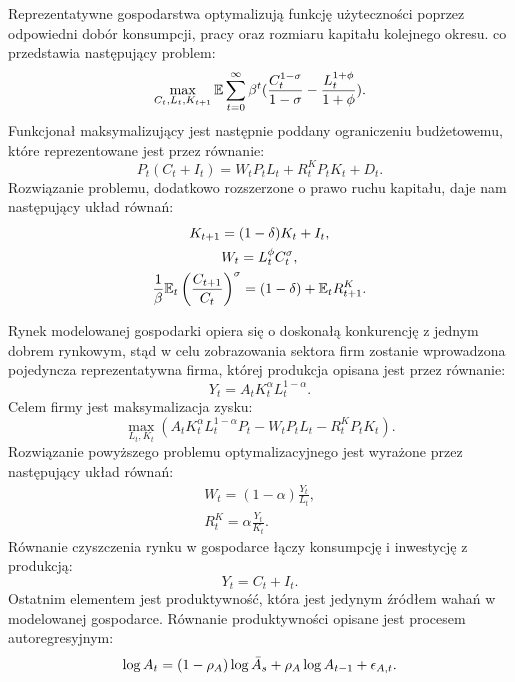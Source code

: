 Reprezentatywne gospodarstwa optymalizują funkcję użyteczności poprzez odpowiedni dobór konsumpcji, pracy oraz rozmiaru kapitału kolejnego okresu. co przedstawia następujący problem:
\begin{equation}
    \max_{C_{t}, L_{t}, K_{t+1}}\mathbb{E} \sum_{t=0}^{\infty} \beta^t(\frac{C^{1-\sigma}_{t}}{1-\sigma} - \frac{L^{1+\phi}_{t}}{1+\phi}).
\end{equation}
Funkcjonał maksymalizujący jest następnie poddany ograniczeniu budżetowemu, które reprezentowane jest przez równanie:
\begin{equation}
    P_t(C_{t} + I_{t}) = W_t P_t L_{t} + R^K_t P_t K_{t} + D_t.
\end{equation}
Rozwiązanie problemu, dodatkowo rozszerzone o prawo ruchu kapitału, daje nam następujący układ równań:
\begin{gather}
    K_{t+1} = (1-\delta)K_t + I_t, \\
    W_t = L_t^{\phi} C_t^{\sigma},\\
    \frac{1}{\beta}\mathbb{E}_t\left(\frac{C_{t+1}}{C_t}\right)^\sigma = (1-\delta) + \mathbb{E}_t R^K_{t+1}.
\end{gather}

Rynek modelowanej gospodarki opiera się o doskonałą konkurencję z jednym dobrem rynkowym, stąd w celu zobrazowania sektora firm zostanie wprowadzona pojedyncza reprezentatywna firma, której produkcja opisana jest przez równanie: 
\begin{equation}
    Y_{t} = A_t K_{t}^\alpha L^{1-\alpha}_{t}.
\end{equation}
Celem firmy jest maksymalizacja zysku:
\begin{equation}
    \max_{L_t, K_t} \left(A_t K_{t}^\alpha L^{1-\alpha}_{t} P_t - W_t P_t L_t - R^K_t P_t K_t\right).
\end{equation}
Rozwiązanie powyższego problemu optymalizacyjnego jest wyrażone przez następujący układ równań:
\begin{gather}
    W_t = (1-\alpha)\frac{Y_t}{L_t},\\
    R^K_t = \alpha \frac{Y_t}{K_t}.
\end{gather}
Równanie czyszczenia rynku w gospodarce łączy konsumpcję i inwestycję z produkcją:
\begin{equation}
    Y_t = C_t + I_t.
\end{equation}
Ostatnim elementem jest produktywność, która jest jedynym źródłem wahań w modelowanej gospodarce. Równanie produktywności opisane jest procesem autoregresyjnym:
\begin{equation}
    \log{A_t} = (1-\rho_A)\log{\bar{A}_s} + \rho_A \log{A_{t-1}} + \epsilon_{A,t}.
\end{equation}


